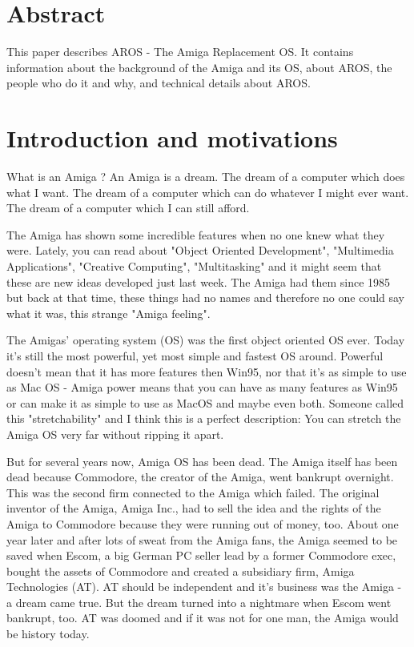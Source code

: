 \setlength{\parskip}{10pt}
\addtolength{\textheight}{2cm}
\addtolength{\textwidth}{2cm}
\addtolength{\hoffset}{-1cm}
\addtolength{\voffset}{-1cm}



\part{Abstract}

This paper describes AROS - The Amiga Replacement OS. It contains
information about the background of the Amiga and its OS, about AROS, the
people who do it and why, and technical details about AROS.

\part{Introduction and motivations}

What is an Amiga ? An Amiga is a dream. The dream of a computer which
does what I want. The dream of a computer which can do whatever I might
ever want. The dream of a computer which I can still afford.

The Amiga has shown some incredible features when no one knew what they
were. Lately, you can read about "Object Oriented Development", "Multimedia
Applications", "Creative Computing", "Multitasking" and it might seem that
these are new ideas developed just last week. The Amiga had them since 1985
but back at that time, these things had no names and therefore no one could
say what it was, this strange "Amiga feeling".

The Amigas' operating system (OS) was the first object oriented OS ever.
Today it's still the most powerful, yet most simple and fastest OS around.
Powerful doesn't mean that it has more features then Win95, nor that it's
as simple to use as Mac OS - Amiga power means that you can have as many
features as Win95 or can make it as simple to use as MacOS and maybe even
both. Someone called this "stretchability" and I think this is a perfect
description: You can stretch the Amiga OS very far without ripping it apart.

But for several years now, Amiga OS has been dead. The Amiga itself has been
dead because Commodore, the creator of the Amiga, went bankrupt overnight.
This was the second firm connected to the Amiga which failed. The
original inventor of the Amiga, Amiga Inc., had to sell the idea and the
rights of the Amiga to Commodore because they were running out of money,
too. About one year later and after lots of sweat from the Amiga fans,
the Amiga seemed to be saved when Escom, a big German PC seller lead by
a former Commodore exec, bought the assets of Commodore and created
a subsidiary firm, Amiga Technologies (AT). AT should be
independent and it's business was the Amiga - a dream came true. But
the dream turned into a nightmare when Escom went bankrupt, too.
AT was doomed and if it was not for one man, the
Amiga would be history today.

